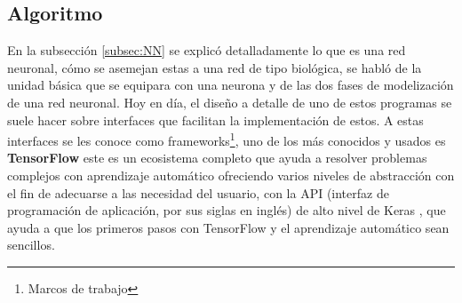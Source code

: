 \documentclass[12pt,letterpaper,oneside,openright]{book}
\begin{document}
\subsection{Algoritmo}

En la subsección \ref{subsec:NN} se explicó detalladamente lo que es una red neuronal, cómo se asemejan estas a una red de tipo biológica, se habló de la unidad básica que se equipara con una neurona y de las dos fases de modelización de una red neuronal. Hoy en día, el diseño a detalle de uno de estos programas se suele hacer sobre interfaces que facilitan la implementación de estos. A estas interfaces se les conoce como frameworks\footnote{Marcos de trabajo}, uno de los más conocidos y usados es \textbf{TensorFlow} \cite{tensorflow15} este es un ecosistema completo que ayuda a resolver problemas complejos con aprendizaje automático ofreciendo varios niveles de abstracción con el fin de adecuarse a las necesidad del usuario, con la API (interfaz de programación de aplicación, por sus siglas en inglés) de alto nivel de Keras \cite{keras15}, que ayuda a que los primeros pasos con TensorFlow y el aprendizaje automático sean sencillos. 
\end{document}
